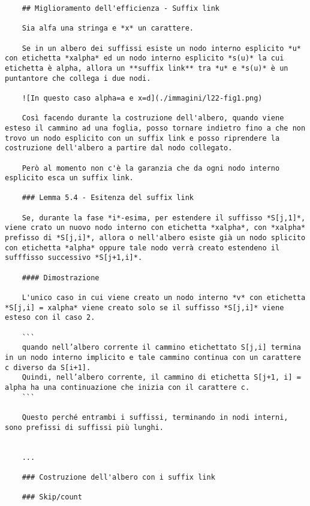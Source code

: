 
\begin{verbatim}
	## Miglioramento dell'efficienza - Suffix link
	
	Sia alfa una stringa e *x* un carattere.
	
	Se in un albero dei suffissi esiste un nodo interno esplicito *u* con etichetta *xalpha* ed un nodo interno esplicito *s(u)* la cui etichetta è alpha, allora un **suffix link** tra *u* e *s(u)* è un puntantore che collega i due nodi.
	
	![In questo caso alpha=a e x=d](./immagini/l22-fig1.png)
	
	Così facendo durante la costruzione dell'albero, quando viene esteso il cammino ad una foglia, posso tornare indietro fino a che non trovo un nodo esplicito con un suffix link e posso riprendere la costruzione dell'albero a partire dal nodo collegato.
	
	Però al momento non c'è la garanzia che da ogni nodo interno esplicito esca un suffix link.
	
	### Lemma 5.4 - Esitenza del suffix link
	
	Se, durante la fase *i*-esima, per estendere il suffisso *S[j,1]*, viene crato un nuovo nodo interno con etichetta *xalpha*, con *xalpha* prefisso di *S[j,i]*, allora o nell'albero esiste già un nodo splicito con etichetta *alpha* oppure tale nodo verrà creato estendeno il sufffisso successivo *S[j+1,i]*.
	
	#### Dimostrazione
	
	L'unico caso in cui viene creato un nodo interno *v* con etichetta *S[j,i] = xalpha* viene creato solo se il suffisso *S[j,i]* viene esteso con il caso 2.
	
	```
	quando nell’albero corrente il cammino etichettato S[j,i] termina in un nodo interno implicito e tale cammino continua con un carattere c diverso da S[i+1].
	Quindi, nell’albero corrente, il cammino di etichetta S[j+1, i] = alpha ha una continuazione che inizia con il carattere c.
	```
	
	Questo perché entrambi i suffissi, terminando in nodi interni, sono prefissi di suffissi più lunghi.
	
	
	...
	
	### Costruzione dell'albero con i suffix link
	
	### Skip/count
\end{verbatim}